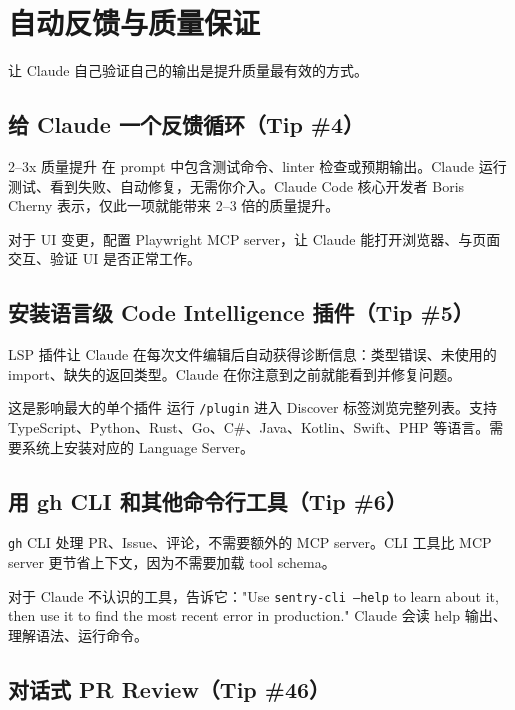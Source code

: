 \section{自动反馈与质量保证}

让 Claude 自己验证自己的输出是提升质量最有效的方式。

\subsection{给 Claude 一个反馈循环（Tip \#4）}

\begin{importantbox}{2--3x 质量提升}
在 prompt 中包含测试命令、linter 检查或预期输出。Claude 运行测试、看到失败、自动修复，无需你介入。Claude Code 核心开发者 Boris Cherny 表示，仅此一项就能带来 2--3 倍的质量提升。
\end{importantbox}

对于 UI 变更，配置 Playwright MCP server，让 Claude 能打开浏览器、与页面交互、验证 UI 是否正常工作。

\subsection{安装语言级 Code Intelligence 插件（Tip \#5）}

LSP 插件让 Claude 在每次文件编辑后自动获得诊断信息：类型错误、未使用的 import、缺失的返回类型。Claude 在你注意到之前就能看到并修复问题。

\begin{knowledgebox}{这是影响最大的单个插件}
运行 \texttt{/plugin} 进入 Discover 标签浏览完整列表。支持 TypeScript、Python、Rust、Go、C\#、Java、Kotlin、Swift、PHP 等语言。需要系统上安装对应的 Language Server。
\end{knowledgebox}

\subsection{用 gh CLI 和其他命令行工具（Tip \#6）}

\texttt{gh} CLI 处理 PR、Issue、评论，不需要额外的 MCP server。CLI 工具比 MCP server 更节省上下文，因为不需要加载 tool schema。

对于 Claude 不认识的工具，告诉它："Use \texttt{sentry-cli --help} to learn about it, then use it to find the most recent error in production." Claude 会读 help 输出、理解语法、运行命令。

\subsection{对话式 PR Review（Tip \#46）}

